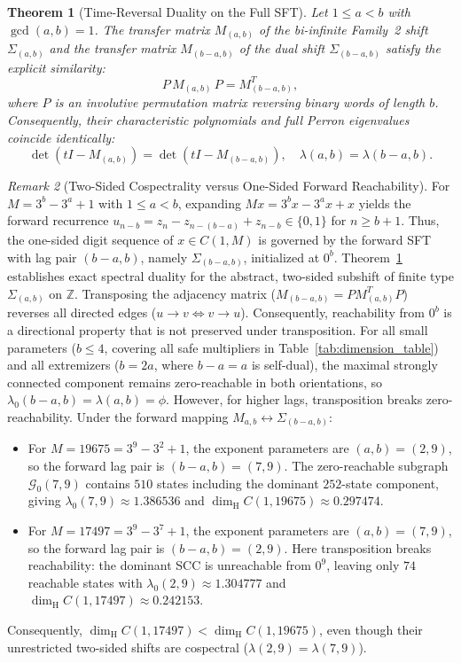 \documentclass[11pt,reqno]{amsart}
\theoremstyle{plain}
\newtheorem{theorem}{Theorem}[section]
\theoremstyle{definition}
\theoremstyle{remark}
\newtheorem{remark}[theorem]{Remark}
\newcommand{\Z}{\mathbb{Z}}
\newcommand{\dimH}{\dim_{\mathrm{H}}}
\begin{document}
\begin{theorem}[Time-Reversal Duality on the Full SFT]\label{thm:time_reversal}
Let $1 \le a < b$ with $\gcd(a, b) = 1$. The transfer matrix $M_{(a,b)}$ of the bi-infinite Family~2 shift $\Sigma_{(a,b)}$ and the transfer matrix $M_{(b-a,b)}$ of the dual shift $\Sigma_{(b-a,b)}$ satisfy the explicit similarity:
\begin{equation}
P \, M_{(a,b)} \, P = M_{(b-a,b)}^T,
\end{equation}
where $P$ is an involutive permutation matrix reversing binary words of length $b$. Consequently, their characteristic polynomials and full Perron eigenvalues coincide identically:
\begin{equation}
\det(t I - M_{(a,b)}) = \det(t I - M_{(b-a,b)}), \quad \lambda(a, b) = \lambda(b-a, b).
\end{equation}
\end{theorem}

\begin{remark}[Two-Sided Cospectrality versus One-Sided Forward Reachability]\label{rem:reachability}
For $M = 3^b - 3^a + 1$ with $1 \le a < b$, expanding $Mx = 3^b x - 3^a x + x$ yields the forward recurrence $u_{n-b} = z_n - z_{n-(b-a)} + z_{n-b} \in \{0, 1\}$ for $n \ge b+1$. Thus, the one-sided digit sequence of $x \in C(1, M)$ is governed by the forward SFT with lag pair $(b-a, b)$, namely $\Sigma_{(b-a, b)}$, initialized at $0^b$.
Theorem~\ref{thm:time_reversal} establishes exact spectral duality for the abstract, two-sided subshift of finite type $\Sigma_{(a, b)}$ on $\Z$.
Transposing the adjacency matrix ($M_{(b-a,b)} = P M_{(a,b)}^T P$) reverses all directed edges ($u \to v \iff v \to u$). Consequently, reachability from $0^b$ is a directional property that is not preserved under transposition.
For all small parameters ($b \le 4$, covering all safe multipliers in Table~\ref{tab:dimension_table}) and all extremizers ($b = 2a$, where $b-a = a$ is self-dual), the maximal strongly connected component remains zero-reachable in both orientations, so $\lambda_0(b-a, b) = \lambda(a, b) = \phi$.
However, for higher lags, transposition breaks zero-reachability. Under the forward mapping $M_{a, b} \leftrightarrow \Sigma_{(b-a, b)}$:
\begin{itemize}
    \item For $M = 19675 = 3^9 - 3^2 + 1$, the exponent parameters are $(a, b) = (2, 9)$, so the forward lag pair is $(b-a, b) = (7, 9)$. The zero-reachable subgraph $\mathcal{G}_0(7, 9)$ contains $510$ states including the dominant $252$-state component, giving $\lambda_0(7, 9) \approx 1.386536$ and $\dimH C(1, 19675) \approx 0.297474$.
    \item For $M = 17497 = 3^9 - 3^7 + 1$, the exponent parameters are $(a, b) = (7, 9)$, so the forward lag pair is $(b-a, b) = (2, 9)$. Here transposition breaks reachability: the dominant SCC is unreachable from $0^9$, leaving only $74$ reachable states with $\lambda_0(2, 9) \approx 1.304777$ and $\dimH C(1, 17497) \approx 0.242153$.
\end{itemize}
Consequently, $\dimH C(1, 17497) < \dimH C(1, 19675)$, even though their unrestricted two-sided shifts are cospectral ($\lambda(2, 9) = \lambda(7, 9)$).
\end{remark}
\end{document}
